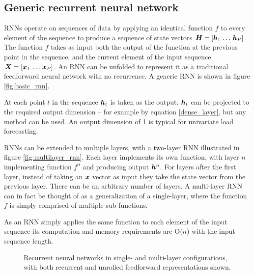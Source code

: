 \subsection{Generic recurrent neural network}
RNNs operate on sequences of data by applying an identical function $f$ to every element of the sequence to produce a sequence of state vectors ${\bm{H}} = [{\bm{h}}_1 \, \ldots \, {\bm{h}}_P]$.
The function $f$ takes as input both the output of the function at the previous point in the sequence, and the current element of the input sequence ${\bm{X}} = [{\bm{x}}_1 \, \ldots \, {\bm{x}}_P]$.
An RNN can be unfolded to represent it as a traditional feedforward neural network with no recurrence.
A generic RNN is shown in figure \ref{fig:basic_rnn}.

At each point $t$ in the sequence ${\bm{h}}_t$ is taken as the output.
${\bm{h}}_t$ can be projected to the required output dimension -- for example by equation \ref{dense_layer}, but any method can be used.
An output dimension of 1 is typical for univariate load forecasting.

RNNs can be extended to multiple layers, with a two-layer RNN illustrated in figure \ref{fig:multilayer_rnn}.
Each layer implements its own function, with layer $n$ implementing function $f^n$ and producing output ${\bm{h}}^n$.
For layers after the first layer, instead of taking an ${\bm{x}}$ vector as input they take the state vector from the previous layer.
There can be an arbitrary number of layers.
A multi-layer RNN can in fact be thought of as a generalization of a single-layer, where the function $f$ is simply comprised of multiple sub-functions.

As an RNN simply applies the same function to each element of the input sequence its computation and memory requirements are O($n$) with the input sequence length.

\begin{figure}[htbp]
	\centering
	\quad\quad
	\caption{Recurrent neural networks in single- and multi-layer configurations, with both recurrent and unrolled feedforward representations shown. }
	\label{fig:rnn}
\end{figure}


